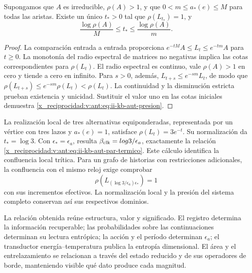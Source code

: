 \begin{proposition}
Supongamos que \(A\) es irreducible, \(\rho(A)>1\), y que
\(0<m\leq a_*(e)\leq M\) para todas las aristas. Existe un único
\(t_*>0\) tal que \(\rho(L_{t_*})=1\), y
\begin{equation}
 \frac{\log\rho(A)}{M}\leq t_*\leq
 \frac{\log\rho(A)}{m}.
 \label{x_reciprocidad:v:ant:eq:ii-kb-aut-presion}
\end{equation}
\end{proposition}
\begin{proof}
La comparación entrada a entrada proporciona
\(e^{-tM}A\leq L_t\leq e^{-tm}A\) para \(t\geq0\).
La monotonía del radio espectral de matrices no negativas implica
las cotas correspondientes para \(\rho(L_t)\). El radio espectral
es continuo, vale \(\rho(A)>1\) en cero y tiende a cero en infinito.
Para \(s>0\), además,
\(L_{t+s}\leq e^{-sm}L_t\), de modo que
\(\rho(L_{t+s})\leq e^{-sm}\rho(L_t)<\rho(L_t)\).
La continuidad y la disminución estricta prueban existencia y
unicidad. Sustituir el valor uno en las cotas iniciales demuestra
\eqref{x_reciprocidad:v:ant:eq:ii-kb-aut-presion}.
\end{proof}

La realización local de tres alternativas equiponderadas, representada
por un vértice con tres lazos y \(a_*(e)=1\), satisface
\(\rho(L_t)=3e^{-t}\). Su normalización da \(t_*=\log3\).
Con \(\epsilon_*=\epsilon_a\), resulta
\(\beta_{\rm clk}=\log3/\epsilon_a\), exactamente la relación
\eqref{x_reciprocidad:v:ant:eq:ii-kb-aut-par-termico}. Este cálculo identifica la
confluencia local trítica. Para un grafo de historias con restricciones
adicionales, la confluencia con el mismo reloj exige comprobar
\[
 \rho\!\left(L_{(\log3/\epsilon_a)\epsilon_*}\right)=1
\]
con sus incrementos efectivos. La normalización local y la presión
del sistema completo conservan así sus respectivos dominios.

La relación obtenida reúne estructura, valor y significado. El registro
determina la información recuperable; las probabilidades sobre las
continuaciones determinan su lectura entrópica; la acción y el período
determinan \(\epsilon_a\); el transductor energía--temperatura
publica la entropía dimensional. El área y el entrelazamiento se
relacionan a través del estado reducido y de sus operadores de borde,
manteniendo visible qué dato produce cada magnitud.



